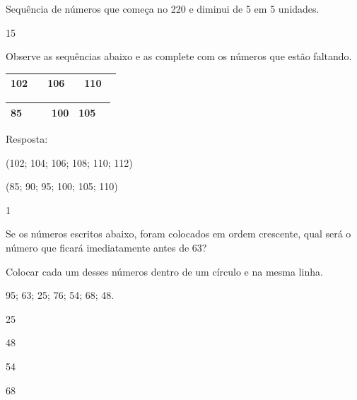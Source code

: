 \begin{escolha}
\begin{escolha}
\item
  Sequência de números que começa no 220 e diminui de 5 em 5 unidades.
\end{escolha}

\num{15}

Observe as sequências abaixo e as complete com os números que estão
faltando.

\begin{escolha}

\item
\end{escolha}

\begin{longtable}[]{@{}llllll@{}}
\toprule
102 & & 106 & & 110 &\tabularnewline
\bottomrule
\end{longtable}

\begin{escolha}

\item
\end{escolha}

\begin{longtable}[]{@{}llllll@{}}
\toprule
85 & & & 100 & 105 &\tabularnewline
\bottomrule
\end{longtable}

Resposta:

\begin{escolha}

\item
  (102; 104; 106; 108; 110; 112)
\item
  (85; 90; 95; 100; 105; 110)
\end{escolha}


\num{1}

Se os números escritos abaixo, foram colocados em ordem crescente, qual
será o número que ficará imediatamente antes de 63?

Colocar cada um desses números dentro de um círculo e na mesma linha.

95; 63; 25; 76; 54; 68; 48.

\begin{escolha}

\item
  25
\item
  48
\item
  54
\item
  68
\end{escolha}


\end{escolha}
